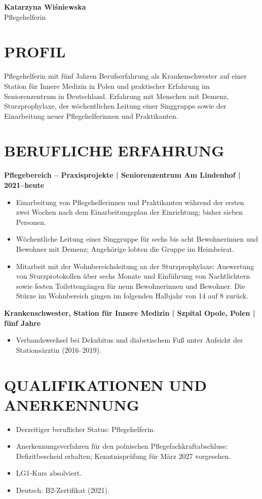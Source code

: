 \documentclass[11pt,a4paper]{article}
\begin{document}
\begin{center}
{\Huge\bfseries\color{primarycolor} Katarzyna Wiśniewska}\\[0.35em]
{\large\color{accentcolor} Pflegehelferin}
\end{center}

\section*{PROFIL}
Pflegehelferin mit fünf Jahren Berufserfahrung als Krankenschwester auf einer Station für Innere Medizin in Polen und praktischer Erfahrung im Seniorenzentrum in Deutschland. Erfahrung mit Menschen mit Demenz, Sturzprophylaxe, der wöchentlichen Leitung einer Singgruppe sowie der Einarbeitung neuer Pflegehelferinnen und Praktikanten.

\section*{BERUFLICHE ERFAHRUNG}
\textbf{Pflegebereich – Praxisprojekte | Seniorenzentrum Am Lindenhof | 2021–heute}
\begin{itemize}
\item Einarbeitung von Pflegehelferinnen und Praktikanten während der ersten zwei Wochen nach dem Einarbeitungsplan der Einrichtung; bisher sieben Personen.
\item Wöchentliche Leitung einer Singgruppe für sechs bis acht Bewohnerinnen und Bewohner mit Demenz; Angehörige lobten die Gruppe im Heimbeirat.
\item Mitarbeit mit der Wohnbereichsleitung an der Sturzprophylaxe: Auswertung von Sturzprotokollen über sechs Monate und Einführung von Nachtlichtern sowie festen Toilettengängen für neun Bewohnerinnen und Bewohner. Die Stürze im Wohnbereich gingen im folgenden Halbjahr von 14 auf 8 zurück.
\end{itemize}

\textbf{Krankenschwester, Station für Innere Medizin | Szpital Opole, Polen | fünf Jahre}
\begin{itemize}
\item Verbandswechsel bei Dekubitus und diabetischem Fuß unter Aufsicht der Stationsärztin (2016–2019).
\end{itemize}

\section*{QUALIFIKATIONEN UND ANERKENNUNG}
\begin{itemize}
\item Derzeitiger beruflicher Status: Pflegehelferin.
\item Anerkennungsverfahren für den polnischen Pflegefachkraftabschluss: Defizitbescheid erhalten; Kenntnisprüfung für März 2027 vorgesehen.
\item LG1-Kurs absolviert.
\item Deutsch: B2-Zertifikat (2021).
\end{itemize}
\end{document}
